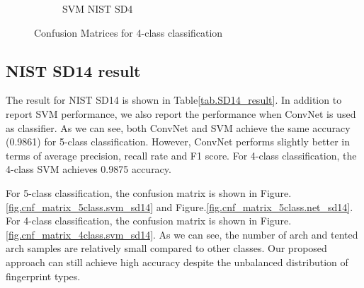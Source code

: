 \begin{figure}[!ht]
\begin{subfigure}[b]{0.25\textwidth}
		\caption{SVM NIST SD4}
		\label{fig.cnf_matrix_4class.svm_sd4}
	\end{subfigure}%

	\caption{Confusion Matrices for 4-class classification}\label{fig.cnf_matrix_4class}
\end{figure}

\subsection{NIST SD14 result}
The result for NIST SD14 is shown in Table\ref{tab.SD14_result}. In addition to report SVM performance, we also report the performance when ConvNet is used as classifier. As we can see, both ConvNet and SVM achieve the same accuracy (0.9861) for 5-class classification. However, ConvNet performs slightly better  in terms of average precision, recall rate and F1 score.
%
For 4-class classification, the 4-class SVM achieves 0.9875 accuracy.

For 5-class classification, the confusion matrix is shown in Figure.\ref{fig.cnf_matrix_5class.svm_sd14} and Figure.\ref{fig.cnf_matrix_5class.net_sd14}.
For 4-class classification, the confusion matrix is shown in Figure.\ref{fig.cnf_matrix_4class.svm_sd14}. 
%
As we can see, the number of arch and tented arch samples are relatively small compared to other classes. Our proposed approach can still achieve high accuracy despite the unbalanced distribution of fingerprint types.


\begin{table}[!ht]
	
	\centering
	\caption{ Experiment results for NIST SD14. In column 4, 5 and 6, we also report the average precision, recall and F1 score for all predicted classes. }
	\label{tab.SD14_result}
\end{table}

